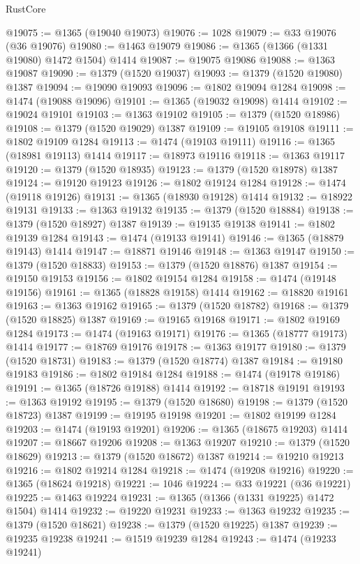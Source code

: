 \begin{lexlean}{RustCore}
\begin{coremodule}
@19075 := @1365 (@19040 @19073)
@19076 := 1028
@19079 := @33 @19076 (@36 @19076)
@19080 := @1463 @19079
@19086 := @1365 (@1366 (@1331 @19080) @1472 @1504) @1414
@19087 := @19075 @19086
@19088 := @1363 @19087
@19090 := @1379 (@1520 @19037)
@19093 := @1379 (@1520 @19080) @1387
@19094 := @19090 @19093
@19096 := @1802 @19094 @1284
@19098 := @1474 (@19088 @19096)
@19101 := @1365 (@19032 @19098) @1414
@19102 := @19024 @19101
@19103 := @1363 @19102
@19105 := @1379 (@1520 @18986)
@19108 := @1379 (@1520 @19029) @1387
@19109 := @19105 @19108
@19111 := @1802 @19109 @1284
@19113 := @1474 (@19103 @19111)
@19116 := @1365 (@18981 @19113) @1414
@19117 := @18973 @19116
@19118 := @1363 @19117
@19120 := @1379 (@1520 @18935)
@19123 := @1379 (@1520 @18978) @1387
@19124 := @19120 @19123
@19126 := @1802 @19124 @1284
@19128 := @1474 (@19118 @19126)
@19131 := @1365 (@18930 @19128) @1414
@19132 := @18922 @19131
@19133 := @1363 @19132
@19135 := @1379 (@1520 @18884)
@19138 := @1379 (@1520 @18927) @1387
@19139 := @19135 @19138
@19141 := @1802 @19139 @1284
@19143 := @1474 (@19133 @19141)
@19146 := @1365 (@18879 @19143) @1414
@19147 := @18871 @19146
@19148 := @1363 @19147
@19150 := @1379 (@1520 @18833)
@19153 := @1379 (@1520 @18876) @1387
@19154 := @19150 @19153
@19156 := @1802 @19154 @1284
@19158 := @1474 (@19148 @19156)
@19161 := @1365 (@18828 @19158) @1414
@19162 := @18820 @19161
@19163 := @1363 @19162
@19165 := @1379 (@1520 @18782)
@19168 := @1379 (@1520 @18825) @1387
@19169 := @19165 @19168
@19171 := @1802 @19169 @1284
@19173 := @1474 (@19163 @19171)
@19176 := @1365 (@18777 @19173) @1414
@19177 := @18769 @19176
@19178 := @1363 @19177
@19180 := @1379 (@1520 @18731)
@19183 := @1379 (@1520 @18774) @1387
@19184 := @19180 @19183
@19186 := @1802 @19184 @1284
@19188 := @1474 (@19178 @19186)
@19191 := @1365 (@18726 @19188) @1414
@19192 := @18718 @19191
@19193 := @1363 @19192
@19195 := @1379 (@1520 @18680)
@19198 := @1379 (@1520 @18723) @1387
@19199 := @19195 @19198
@19201 := @1802 @19199 @1284
@19203 := @1474 (@19193 @19201)
@19206 := @1365 (@18675 @19203) @1414
@19207 := @18667 @19206
@19208 := @1363 @19207
@19210 := @1379 (@1520 @18629)
@19213 := @1379 (@1520 @18672) @1387
@19214 := @19210 @19213
@19216 := @1802 @19214 @1284
@19218 := @1474 (@19208 @19216)
@19220 := @1365 (@18624 @19218)
@19221 := 1046
@19224 := @33 @19221 (@36 @19221)
@19225 := @1463 @19224
@19231 := @1365 (@1366 (@1331 @19225) @1472 @1504) @1414
@19232 := @19220 @19231
@19233 := @1363 @19232
@19235 := @1379 (@1520 @18621)
@19238 := @1379 (@1520 @19225) @1387
@19239 := @19235 @19238
@19241 := @1519 @19239 @1284
@19243 := @1474 (@19233 @19241)

\end{coremodule}
\end{lexlean}
